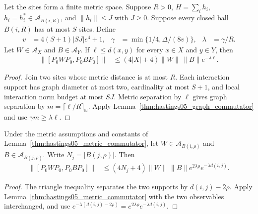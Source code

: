 \begin{lemma}
    \label{thm:hastings05_metric_commutator}
    \leanok
    Let the sites form a finite metric space. Suppose $R>0$,
    $H=\sum_i h_i$, $h_i=h_i^*\in\mathcal A_{B(i,R)}$, and
    $\|h_i\|\le J$ with $J\ge0$. Suppose every closed ball $B(i,R)$
    has at most $S$ sites. Define
    \begin{align}
        v&=4(S+1)|SJ|e^4+1,&
        \gamma&=\min\{1/4,\Delta/(8v)\},&
        \lambda&=\gamma/R.
        \label{eq:hastings05_metric_commutator_rate}
    \end{align}
    Let $W\in\mathcal A_X$ and $B\in\mathcal A_Y$.
    If $\ell\le d(x,y)$ for every $x\in X$ and $y\in Y$, then
    \begin{align}
        \|[P_0WP_0,P_0BP_0]\|
        &\le(4|X|+4)\|W\|\,\|B\|e^{-\lambda\ell}.
        \label{eq:hastings05_metric_commutator}
    \end{align}
\end{lemma}
\begin{proof}\leanok
    Join two sites whose metric distance is at most $R$.
    Each interaction support has graph diameter at most two, cardinality
    at most $S+1$, and local interaction norm budget at most $SJ$.
    Metric separation by $\ell$ gives graph separation by
    $m=\lceil\ell/R\rceil_{\mathbb N}$. Apply
    Lemma~\ref{thm:hastings05_graph_commutator} and use
    $\gamma m\ge\lambda\ell$.
\end{proof}

\begin{lemma}
    \label{thm:hastings05_metric_ball_commutator}
    \leanok
    Under the metric assumptions and constants of
    Lemma~\ref{thm:hastings05_metric_commutator}, let
    $W\in\mathcal A_{B(i,\rho)}$ and $B\in\mathcal A_{B(j,\rho)}$.
    Write $N_j=|B(j,\rho)|$. Then
    \begin{align}
        \|[P_0WP_0,P_0BP_0]\|
        &\le(4N_j+4)\|W\|\,\|B\|
            e^{2\lambda\rho}e^{-\lambda d(i,j)}.
        \label{eq:hastings05_metric_ball_commutator}
    \end{align}
\end{lemma}
\begin{proof}\leanok
    The triangle inequality separates the two supports by
    $d(i,j)-2\rho$. Apply
    Lemma~\ref{thm:hastings05_metric_commutator} with the two
    observables interchanged, and use
    $e^{-\lambda(d(i,j)-2\rho)}=e^{2\lambda\rho}e^{-\lambda d(i,j)}$.
\end{proof}

